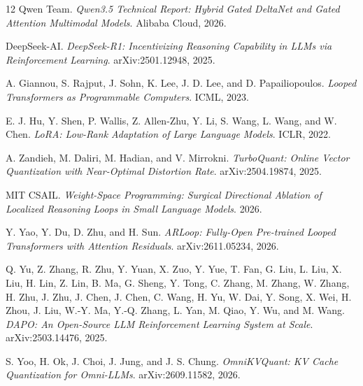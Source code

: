\documentclass[10pt,letterpaper]{article}
\begin{document}
\begin{thebibliography}{12}
Qwen Team. \textit{Qwen3.5 Technical Report: Hybrid Gated DeltaNet and Gated Attention Multimodal Models}. Alibaba Cloud, 2026.

DeepSeek-AI. \textit{DeepSeek-R1: Incentivizing Reasoning Capability in LLMs via Reinforcement Learning}. arXiv:2501.12948, 2025.

A. Giannou, S. Rajput, J. Sohn, K. Lee, J. D. Lee, and D. Papailiopoulos. \textit{Looped Transformers as Programmable Computers}. ICML, 2023.

E. J. Hu, Y. Shen, P. Wallis, Z. Allen-Zhu, Y. Li, S. Wang, L. Wang, and W. Chen. \textit{LoRA: Low-Rank Adaptation of Large Language Models}. ICLR, 2022.

A. Zandieh, M. Daliri, M. Hadian, and V. Mirrokni. \textit{TurboQuant: Online Vector Quantization with Near-Optimal Distortion Rate}. arXiv:2504.19874, 2025.

MIT CSAIL. \textit{Weight-Space Programming: Surgical Directional Ablation of Localized Reasoning Loops in Small Language Models}. 2026.

Y. Yao, Y. Du, D. Zhu, and H. Sun. \textit{ARLoop: Fully-Open Pre-trained Looped Transformers with Attention Residuals}. arXiv:2611.05234, 2026.

Q. Yu, Z. Zhang, R. Zhu, Y. Yuan, X. Zuo, Y. Yue, T. Fan, G. Liu, L. Liu, X. Liu, H. Lin, Z. Lin, B. Ma, G. Sheng, Y. Tong, C. Zhang, M. Zhang, W. Zhang, H. Zhu, J. Zhu, J. Chen, J. Chen, C. Wang, H. Yu, W. Dai, Y. Song, X. Wei, H. Zhou, J. Liu, W.-Y. Ma, Y.-Q. Zhang, L. Yan, M. Qiao, Y. Wu, and M. Wang. \textit{DAPO: An Open-Source LLM Reinforcement Learning System at Scale}. arXiv:2503.14476, 2025.

S. Yoo, H. Ok, J. Choi, J. Jung, and J. S. Chung. \textit{OmniKVQuant: KV Cache Quantization for Omni-LLMs}. arXiv:2609.11582, 2026.
\end{thebibliography}
\end{document}
